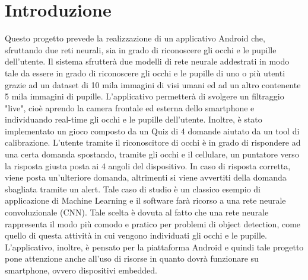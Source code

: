\documentclass[11pt]{article}
\begin{document}
\clearpage
\null
\thispagestyle{empty}
\clearpage

\newpage







\cleardoublepage



\newpage

\tableofcontents


\newpage


\listoffigures



\newpage


\newpage
\fancyfoot[L]{\thepage}
\setcounter{page}{1}
\section{Introduzione}
\label{sec:int}
Questo progetto prevede la realizzazione di un applicativo Android che, sfruttando due reti neurali, sia in grado di riconoscere gli occhi e le pupille dell'utente. Il sistema sfrutterà due modelli di rete neurale
addestrati in modo tale da essere in grado di riconoscere gli occhi e le pupille di uno o più utenti grazie ad un dataset di 10 mila immagini di visi umani ed ad un altro contenente 5 mila immagini di pupille.
L’applicativo permetterà di svolgere un filtraggio "live", cioè aprendo la camera frontale ed esterna dello smartphone e individuando real-time gli occhi e le pupille dell’utente.
\newline
Inoltre, è stato implementato un gioco composto da un Quiz di 4 domande aiutato da un tool di calibrazione. L'utente tramite il riconoscitore di occhi è in grado di rispondere ad una certa domanda spostando, tramite gli occhi e il cellulare, un puntatore verso la risposta giusta posta ai 4 angoli del dispositivo. In caso di risposta corretta, viene posta un'ulteriore domanda, altrimenti si viene avvertiti della domanda sbagliata tramite un alert.
\newline \newline
Tale caso di studio è un classico esempio di applicazione di Machine Learning e il software farà ricorso a una rete neurale convoluzionale (CNN). Tale scelta è dovuta al fatto che una rete neurale rappresenta il modo più comodo e pratico per problemi di object detection, come quello di questa attività in cui vengono individuati gli occhi e le pupille.
\newline \newline
L’applicativo, inoltre, è pensato per la piattaforma Android e quindi tale progetto pone attenzione anche all’uso di risorse in quanto dovrà funzionare su smartphone, ovvero dispositivi embedded.
\end{document}
